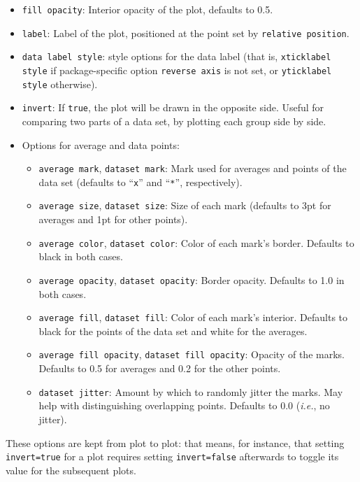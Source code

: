 \documentclass{article}
\begin{document}
\begin{itemize}
		Defaults to black.
	\item \texttt{fill opacity}: Interior opacity of the plot, defaults to
		0.5.
	\item \texttt{label}: Label of the plot, positioned at the point
		set by \texttt{relative position}.
	\item \texttt{data label style}: style options for the data label (that
		is, \texttt{xticklabel style} if package-specific option
		\texttt{reverse axis} is not set, or \texttt{yticklabel style}
		otherwise).
	\item \texttt{invert}: If \texttt{true}, the plot will be drawn in the
		opposite side. Useful for comparing two parts of a data set, by
		plotting each group side by side.
	\item Options for average and data points:
	\begin{itemize}
		\item \texttt{average mark}, \texttt{dataset mark}: Mark used
			for averages and points of the data set (defaults
			to ``\texttt{x}'' and ``\texttt{*}'', respectively).
		\item \texttt{average size}, \texttt{dataset size}: Size
			of each mark (defaults to 3pt for averages and 1pt
			for other points).
		\item \texttt{average color}, \texttt{dataset color}: Color
			of each mark's border. Defaults to black in both
			cases.
		\item \texttt{average opacity}, \texttt{dataset opacity}:
			Border opacity. Defaults to 1.0 in both cases.
		\item \texttt{average fill}, \texttt{dataset fill}: Color
			of each mark's interior. Defaults to black for the
			points of the data set and white for the averages.
		\item \texttt{average fill opacity}, \texttt{dataset fill opacity}:
			Opacity of the marks. Defaults to 0.5 for averages and
			0.2 for the other points.
		\item \texttt{dataset jitter}:
			Amount by which to randomly jitter the marks. May help
			with distinguishing overlapping points. Defaults to
			$0.0$ (\textit{i.e.}, no jitter).
	\end{itemize}
\end{itemize}

These options are kept from plot to plot: that means, for instance, that setting
\texttt{invert=true} for a plot requires setting \texttt{invert=false}
afterwards to toggle its value for the subsequent plots.
\end{document}
